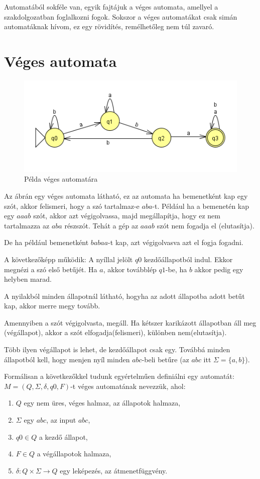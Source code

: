 \documentclass[12pt]{report}
\theoremstyle{definition}
\begin{document}
Automatából sokféle van, egyik fajtájuk a véges automata, amellyel a szakdolgozatban foglalkozni fogok. Sokszor a véges automatákat csak simán automatáknak hívom, ez egy rövidítés, remélhetőleg nem túl zavaró.

\section{Véges automata}

\begin{figure}[H]
\centering
\includegraphics[scale=1]{abaresze.png}
\caption{\label{aut} Példa véges automatára}
\end{figure}

Az ábrán egy véges automata látható, ez az automata ha bemenetként kap egy szót, akkor felismeri, hogy a szó tartalmaz-e $aba$-t. Például ha a bemenetén kap egy $aaab$ szót, akkor azt végigolvassa, majd megállapítja, hogy ez nem tartalmazza az $aba$ részszót. Tehát a gép az $aaab$ szót nem fogadja el (elutasítja).

De ha például bemenetként $babaa$-t kap, azt végigolvasva azt el fogja fogadni.

A következőképp működik: A nyíllal jelölt $q0$ kezdőállapotból indul. Ekkor megnézi a szó első betűjét. Ha $a$, akkor továbblép $q1$-be, ha $b$ akkor pedig egy helyben marad.

A nyilakból minden állapotnál látható, hogyha az adott állapotba adott betűt kap, akkor merre megy tovább.

Amennyiben a szót végigolvasta, megáll. Ha kétszer karikázott állapotban áll meg (végállapot), akkor a szót elfogadja(felismeri), különben nem(elutasítja).

Több ilyen végállapot is lehet, de kezdőállapot csak egy. Továbbá minden állapotból kell, hogy menjen nyíl minden $abc$-beli betűre (az $abc$ itt $\Sigma = \{a,b\}$).

Formálisan a következőkkel tudunk egyértelműen definiálni egy automatát:\\
$M = (Q, \Sigma, \delta, q0, F)$-t véges automatának nevezzük, ahol:
\begin{enumerate}
\item $Q$ egy nem üres, véges halmaz, az állapotok halmaza,
\item $\Sigma$ egy $abc$, az input $abc$,
\item $q0 \in Q$ a kezdő állapot,
\item $F \in Q$ a végállapotok halmaza,
\item $\delta : Q \times \Sigma \to Q$ egy leképezés, az átmenetfüggvény.
\end{enumerate}
\end{document}
